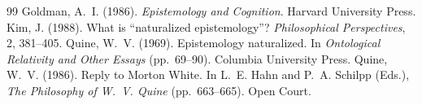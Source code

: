 \documentclass{situationist-preprint}
\begin{document}
\begin{thebibliography}{99}\small
{} Goldman, A.~I. (1986). \emph{Epistemology and Cognition}. Harvard University Press.
 Kim, J. (1988). What is \enquote{naturalized epistemology}? \emph{Philosophical Perspectives}, 2, 381--405.
 Quine, W.~V. (1969). Epistemology naturalized. In \emph{Ontological Relativity and Other Essays} (pp.~69--90). Columbia University Press.
 Quine, W.~V. (1986). Reply to Morton White. In L.~E. Hahn and P.~A. Schilpp (Eds.), \emph{The Philosophy of W.~V. Quine} (pp.~663--665). Open Court.
\end{thebibliography}
\end{document}
